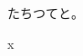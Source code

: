 \documentclass[pdflatex]{jlreq}
\begin{document}
\makeatletter
\def\jlreqpar@verifywd{1}%
\hsize=70pt
\begin{jlreqparagraph}
たちつてと。
\end{jlreqparagraph}
\makeatother
x
\end{document}

